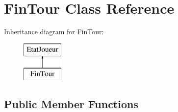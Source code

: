 \hypertarget{class_fin_tour}{\section{Fin\-Tour Class Reference}
\label{class_fin_tour}
}
Inheritance diagram for Fin\-Tour\-:\begin{figure}[H]
\begin{center}
\leavevmode
\includegraphics[height=2.000000cm]{class_fin_tour}
\end{center}
\end{figure}
\subsection*{Public Member Functions}
